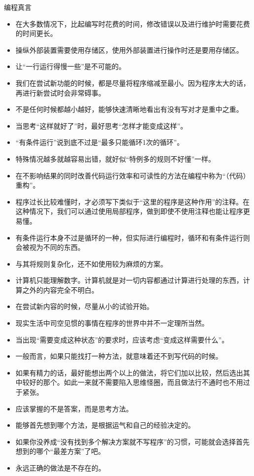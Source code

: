 \begin{frame}
\begin{block}{编程真言}
\begin{itemize}
      \item 在大多数情况下，比起编写时花费的时间，修改错误以及进行维护时需要花费的时间更长。
      \item 操纵外部装置需要使用存储区，使用外部装置进行操作时还是要用存储区。
      \item 让“一行运行得慢一些”是不可能的。
      \item 我们在尝试新功能的时候，都是尽量将程序缩减至最小。因为程序太大的话，再进行新尝试时会非常碍事。
      \item 不是任何时候都越小越好，能够快速清晰地看出有没有写对才是重中之重。
      \item 当思考“这样就好了”时，最好思考“怎样才能变成这样”。
      \item “有条件运行”说到底不过是“最多只能循环1次的循环”。
      \item 特殊情况越多就越容易出错，就好似“特例多的规则不好懂”一样。
      \item 在不影响结果的同时改善代码运行效率和可读性的方法在编程中称为“（代码）重构”。
      \item 程序过长比较难懂时，才必须写下类似于“这里的程序是这种作用”的注释。在这种情况下，我们可以通过使用局部程序，做到即使不使用注释也能让程序更易懂。
      \item 有条件运行本身不过是循环的一种，但实际进行编程时，循环和有条件运行则会被视为不同的东西。
      \item 与其将规则复杂化，还不如使用较为麻烦的方案。
      \item 计算机只能理解数字。计算机就是对一切内容都通过计算进行处理的东西，计算之外的内容完全不明白。
      \item 在尝试新内容的时候，尽量从小的试验开始。
      \item 现实生活中司空见惯的事情在程序的世界中并不一定理所当然。
      \item 当出现“需要变成这种状态”的要求时，应该考虑“变成这样需要什么”。
      \item 一般而言，如果只能找打一种方法，就意味着还不到写代码的时候。
      \item 如果有精力的话，最好能想出两个以上的做法，将它们加以比较，然后选出其中较好的那个。如此一来就不需要陷入思维怪圈，而且做法行不通时也不用过于紧张。
      \item 应该掌握的不是答案，而是思考方法。
      \item 能够首先想到哪个方法，是根据运气和自己的经验决定的。
      \item 如果你没养成“没有找到多个解决方案就不写程序”的习惯，可能就会选择首先想到的哪个“最差方案”了吧。
      \item 永远正确的做法是不存在的。

\end{itemize}
\end{block}
\end{frame}
